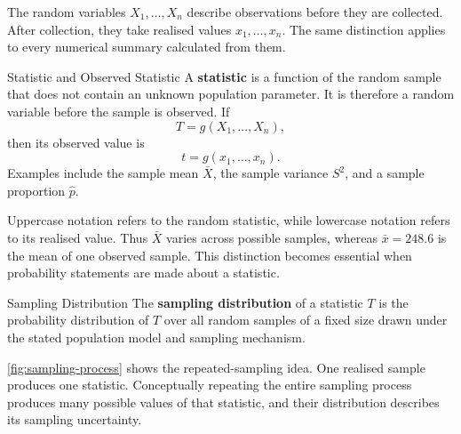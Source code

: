 The random variables $X_1,\ldots,X_n$ describe observations before they are collected. After collection, they take realised values $x_1,\ldots,x_n$. The same distinction applies to every numerical summary calculated from them.

\begin{definition}{Statistic and Observed Statistic}
A \textbf{statistic} is a function of the random sample that does not contain an unknown population parameter. It is therefore a random variable before the sample is observed. If
\[
    T=g(X_1,\ldots,X_n),
\]
then its observed value is
\[
    t=g(x_1,\ldots,x_n).
\]
Examples include the sample mean $\bar X$, the sample variance $S^2$, and a sample proportion $\widehat p$.
\end{definition}

Uppercase notation refers to the random statistic, while lowercase notation refers to its realised value. Thus $\bar X$ varies across possible samples, whereas $\bar x=248.6$ is the mean of one observed sample. This distinction becomes essential when probability statements are made about a statistic.

\begin{definition}{Sampling Distribution}
The \textbf{sampling distribution} of a statistic $T$ is the probability distribution of $T$ over all random samples of a fixed size drawn under the stated population model and sampling mechanism.
\end{definition}

\autoref{fig:sampling-process} shows the repeated-sampling idea. One realised sample produces one statistic. Conceptually repeating the entire sampling process produces many possible values of that statistic, and their distribution describes its sampling uncertainty.

